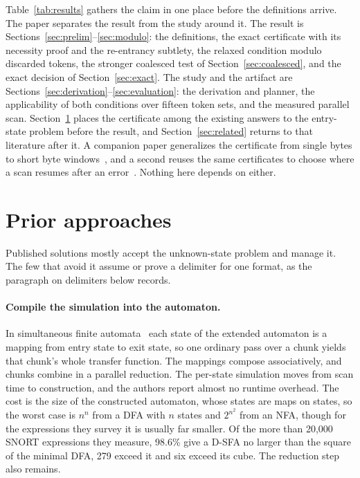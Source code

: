 \documentclass[11pt,a4paper]{article}
\theoremstyle{definition}
\theoremstyle{plain}
\begin{document}
Table~\ref{tab:results} gathers the claim in one place before the definitions arrive. The paper separates the result
from the study around it. The result is Sections~\ref{sec:prelim}--\ref{sec:modulo}: the definitions, the exact
certificate with its necessity proof and the re-entrancy subtlety, the relaxed condition modulo discarded tokens, the
stronger coalesced test of Section~\ref{sec:coalesced}, and the exact decision of Section~\ref{sec:exact}. The study and
the artifact are Sections~\ref{sec:derivation}--\ref{sec:evaluation}: the derivation and planner, the applicability of
both conditions over fifteen token sets, and the measured parallel scan. Section~\ref{sec:prior} places the certificate
among the existing answers to the entry-state problem before the result, and Section~\ref{sec:related} returns to that
literature after it. A companion paper generalizes the certificate from single bytes to short byte
windows~\cite{nidhogg2026splitwindows}, and a second reuses the same certificates to choose where a scan resumes after
an error~\cite{nidhogg2026panicmode}. Nothing here depends on either.

\section{Prior approaches}
\label{sec:prior}

Published solutions mostly accept the unknown-state problem and manage it. The few that avoid it assume or prove a
delimiter for one format, as the paragraph on delimiters below records.

\paragraph{Compile the simulation into the automaton.} In simultaneous finite automata~\cite{sinya2013sfa} each state of
the extended automaton is a mapping from entry state to exit state, so one ordinary pass over a chunk yields that
chunk's whole transfer function. The mappings compose associatively, and chunks combine in a parallel reduction. The
per-state simulation moves from scan time to construction, and the authors report almost no runtime overhead. The cost
is the size of the constructed automaton, whose states are maps on states, so the worst case is $n^n$ from a DFA with
$n$ states and $2^{n^2}$ from an NFA, though for the expressions they survey it is usually far smaller. Of the more than
20,000 SNORT expressions they measure, 98.6\% give a D-SFA no larger than the square of the minimal DFA, 279 exceed it
and six exceed its cube. The reduction step also remains.
\end{document}
